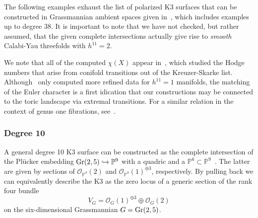 \documentclass[11pt,a4paper]{article}
\numberwithin{equation}{section}
\numberwithin{table}{section}\setlength{\multlinegap}{25pt}
\begin{document}
The following examples exhaust the list of polarized K3 surfaces that can be constructed in Grassmannian ambient spaces given in~\cite{debarre2020hyperkahler}, which includes examples up to degree $38$. It is important to note that we have not checked, but rather assumed, that the given complete intersections actually give rise to \emph{smooth} Calabi-Yau threefolds with $h^{11}=2$.

We note that all of the computed $\chi(X)$ appear in~\cite{Batyrev:2008rp}, which studied the Hodge numbers that arise from conifold transitions out of the Kreuzer-Skarke list. Although~\cite{Batyrev:2008rp} only computed more refined data for $h^{11}=1$ manifolds, the matching of the Euler character is a first idication that our constructions may be connected to the toric landscape via extremal transitions. For a similar relation in the context of genus one fibrations, see~\cite{Knapp:2021vkm}.

\subsubsection*{Degree 10}

A general degree 10 K3 surface can be constructed as the complete intersection of the Plücker embedding $\textup{Gr}(2,5)\hookrightarrow\mathbb{P}^9$ with a quadric and a $\mathbb{P}^6\subset \mathbb{P}^9$~\cite{debarre2020hyperkahler}. The latter are given by sections of $\mathcal{O}_{\mathbb{P}^9}(2)$ and $\mathcal{O}_{\mathbb{P}^9}(1)^{\oplus 3}$, respectively. By pulling back we can equivalently describe the K3 as the zero locus of a generic section of the rank four bundle
\begin{equation}
    \label{eq:Degree10FiberDefiningBundle}
    V_G=\mathcal{O}_G(1)^{\oplus 3}\oplus \mathcal{O}_G(2)
\end{equation}
on the six-dimensional Grassmannian $G=\textup{Gr}(2,5)$.
\end{document}
